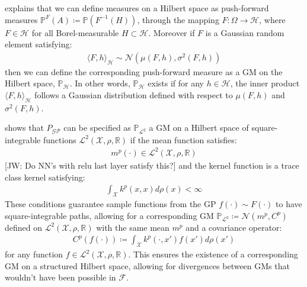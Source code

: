 \documentclass{article}
\newcommand{\jw}[1]{{\color{gray} [JW: #1]}}
\newcommand{\GP}{\operatorname{\mathcal{GP}}}
\numberwithin{equation}{section}
\begin{document}
\cite{wild2022generalized} explains that we can define measures on a Hilbert space as push-forward measures $\mathbb{P}^{F}(A) \coloneqq \mathbb{P}(F^{-1}(H))$, through the mapping $F: \Omega \rightarrow \mathcal{H}$, where $F \in \mathcal{H}$ for all Borel-measurable $H \subset \mathcal{H}$. Moreover if $F$ is a Gaussian random element satisfying:
\begin{align}
    \langle F, h \rangle_\mathcal{H} \sim \mathcal{N}\left(\mu(F, h), \sigma^2(F, h)\right)
\label{gre}
\end{align}
then we can define the corresponding push-forward measure as a GM on the Hilbert space, $\mathbb{P}_{\mathcal{H}}$. In other words, $\mathbb{P}_{\mathcal{H}}$ exists if for any $h \in \mathcal{H}$, the inner product $\langle F, h \rangle_\mathcal{H}$ follows a Gaussian distribution defined with respect to $\mu(F, h)$ and $\sigma^2(F, h)$.

\cite{wild2022generalized} shows that $P_{\GP}$ can be specified as $\mathbb{P}_{\mathcal{L}^2}$ a GM on a Hilbert space of square-integrable functions $\mathcal{L}^2(\mathcal{X}, \rho, \mathbb{R})$ if the mean function satisfies:
\begin{align}
    \label{smooth-mean-function-condition}
    m^p(\cdot) \in \mathcal{L}^2(\mathcal{X}, \rho, \mathbb{R})
\end{align}
\jw{Do NN's with relu last layer satisfy this?}
and the kernel function is a trace class kernel satisfying:
\begin{align}
    \int_{\mathcal{X}} k^p(x, x) d\rho(x) < \infty
    \label{trace-kernel-condition}
\end{align}
These conditions guarantee sample functions from the GP $f(\cdot) \sim F(\cdot)$ to have square-integrable paths, allowing for a corresponding GM $\mathbb{P}_{\mathcal{L}^2} \coloneqq \mathcal{N}(m^p, C^p)$ defined on $\mathcal{L}^2(\mathcal{X}, \rho, \mathbb{R})$ with the same mean $m^p$ and a covariance operator:
\begin{align}
    C^p(f(\cdot)) \coloneqq \int_{\mathcal{X}} k^p(\cdot, x')f(x')d \rho(x')
    \label{gm-covariance-operator}
\end{align}
for any function $f \in \mathcal{L}^2(\mathcal{X}, \rho, \mathbb{R})$. This ensures the existence of a corresponding GM on a structured Hilbert space, allowing for divergences between GMs that wouldn't have been possible in $\mathcal{F}$. 
\end{document}
